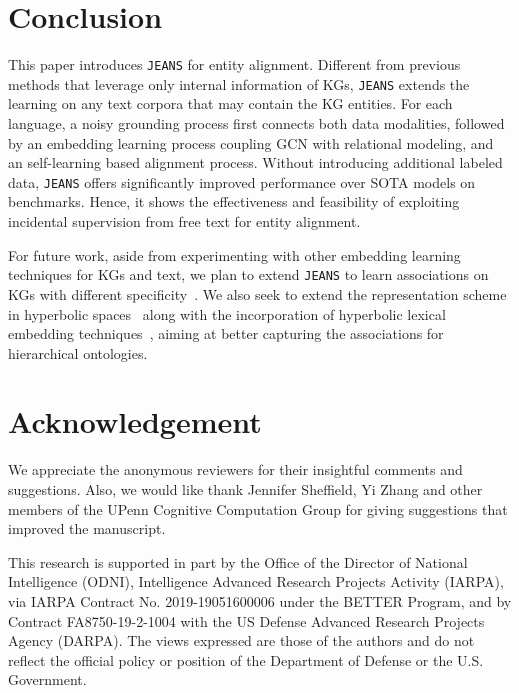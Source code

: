 \documentclass[11pt,a4paper]{article}
\newcommand{\modelname}[0]{\texttt{JEANS}\xspace}
\begin{document}
 \section{Conclusion}

This paper introduces \modelname for entity alignment.
Different from previous methods that leverage only internal information of KGs, \modelname extends the learning on any text corpora that may contain the KG entities.
For each language, a noisy grounding process first connects both data modalities, followed by an embedding learning process coupling GCN with relational modeling, and an self-learning based alignment process.
Without introducing additional labeled data,
\modelname offers significantly improved performance over SOTA models on benchmarks.
Hence, it shows the effectiveness and feasibility of exploiting incidental supervision from free text for entity alignment.

For future work, aside from experimenting with other embedding learning techniques for KGs and text, we plan to extend \modelname to learn associations on KGs with different specificity~\cite{hao2019joie}.
We also seek to extend the representation scheme in hyperbolic spaces~\cite{nickel2017poincare,chen2019edge} along with the incorporation of hyperbolic lexical embedding techniques~\cite{tifrea2018poincare}, aiming at better capturing the associations for hierarchical ontologies.


\section*{Acknowledgement}
We appreciate the anonymous reviewers for their insightful comments and suggestions.
Also, we would like thank Jennifer Sheffield, Yi Zhang and other members of 
the UPenn Cognitive Computation Group for giving suggestions 
that improved 
the manuscript.

This research is supported in part by the Office of the Director of National Intelligence (ODNI), Intelligence Advanced Research Projects Activity (IARPA), via IARPA Contract No. 2019-19051600006 under the BETTER Program, and by Contract FA8750-19-2-1004 with the US Defense Advanced Research Projects Agency (DARPA). The views expressed are those of the authors and do not reflect the official policy or position of the Department of Defense or the U.S. Government. 




\clearpage
\appendix
\end{document}
